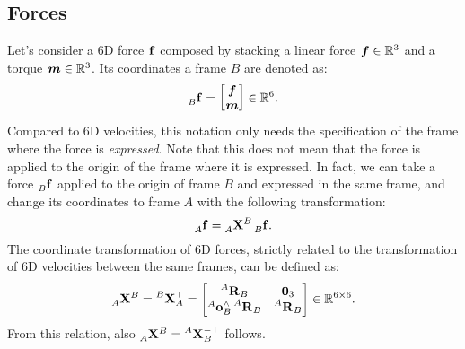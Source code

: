 \subsection{Forces}

Let's consider a 6D force $\forcesix$ composed by stacking a linear force $\forcelin \in \realn^3$ and a torque $\forceang \in \realn^3$.
Its coordinates \wrtl a frame $B$ are denoted as:
%
\begin{equation*}
    \forcesix[B] =
    \begin{bmatrix}
        \forcelin \\ \forceang
    \end{bmatrix}
    \in \realn^6
    .
\end{equation*}
%
Compared to 6D velocities, this notation only needs the specification of the frame where the force is \emph{expressed}.
Note that this does not mean that the force is applied to the origin of the frame where it is expressed.
In fact, we can take a force $\forcesix[B]$ applied to the origin of frame $B$ and expressed in the same frame, and change its coordinates to frame $A$ with the following transformation:
%
\begin{equation}
    \label{eq:sixd_force_transformation}
    \forcesix[A] = \transfor[A]^B \forcesix[B]
    .
\end{equation}
%
The coordinate transformation of 6D forces, strictly related to the transformation of 6D velocities between the same frames, can be defined as:
%
\begin{equation*}
    \transfor[A]^B = \transvel[B]_A^\top =
    \begin{bmatrix}
        \rot[A]_B & \zeros_{3\time3} \\
        \ori[A]_B^\wedge \rot[A]_B & \rot[A]_B
    \end{bmatrix}
    \in \realn^{6\times6}
    .
\end{equation*}
%
From this relation, also $\transfor[A]^B = \transvel[A]_B^{-\top}$ follows.

